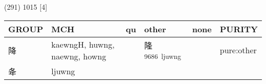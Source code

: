 \documentclass[14pt,a4paper]{scrartcl}
\begin{document}
(291) 1015 {[}4{]}

\begin{longtable}[c]{@{}llllll@{}}
\toprule
\begin{minipage}[b]{0.14\columnwidth}\raggedright\strut
GROUP
\strut\end{minipage} &
\begin{minipage}[b]{0.14\columnwidth}\raggedright\strut
MCH
\strut\end{minipage} &
\begin{minipage}[b]{0.14\columnwidth}\raggedright\strut
qu
\strut\end{minipage} &
\begin{minipage}[b]{0.14\columnwidth}\raggedright\strut
other
\strut\end{minipage} &
\begin{minipage}[b]{0.14\columnwidth}\raggedright\strut
none
\strut\end{minipage} &
\begin{minipage}[b]{0.14\columnwidth}\raggedright\strut
PURITY
\strut\end{minipage}\tabularnewline
\midrule
\endhead
\begin{minipage}[t]{0.14\columnwidth}\raggedright\strut
降
\strut\end{minipage} &
\begin{minipage}[t]{0.14\columnwidth}\raggedright\strut
kaewngH, huwng, naewng, howng
\strut\end{minipage} &
\begin{minipage}[t]{0.14\columnwidth}\raggedright\strut
\strut\end{minipage} &
\begin{minipage}[t]{0.14\columnwidth}\raggedright\strut
隆\textsuperscript{9686~ljuwng}
\strut\end{minipage} &
\begin{minipage}[t]{0.14\columnwidth}\raggedright\strut
\strut\end{minipage} &
\begin{minipage}[t]{0.14\columnwidth}\raggedright\strut
pure:other
\strut\end{minipage}\tabularnewline
\begin{minipage}[t]{0.14\columnwidth}\raggedright\strut
夅
\strut\end{minipage} &
\begin{minipage}[t]{0.14\columnwidth}\raggedright\strut
ljuwng
\strut\end{minipage} &
\begin{minipage}[t]{0.14\columnwidth}\raggedright\strut

\end{minipage}
\end{longtable}
\end{document}
